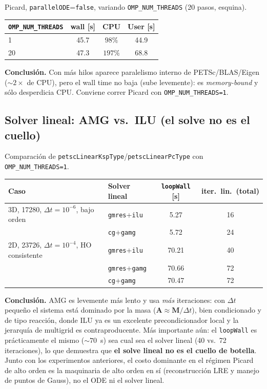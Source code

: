 \documentclass[11pt,a4paper]{article}
\newcommand{\code}[1]{\texttt{\small #1}}
\newcommand{\Mmass}{\mathbf{M}}
\newcommand{\Aimp}{\mathbf{A}}
\newcommand{\dictkey}[1]{\textcolor{black!60!green}{\texttt{\footnotesize #1}}}
\begin{document}
Picard, \dictkey{parallelODE}=\code{false}, variando \code{OMP\_NUM\_THREADS}
(20 pasos, esquina).

\begin{center}
\begin{tabular}{@{}lccc@{}}
\toprule
\code{OMP\_NUM\_THREADS} & wall [s] & CPU & User [s] \\
\midrule
1  & 45.7 & $98\%$  & 44.9 \\
20 & 47.3 & $197\%$ & 68.8 \\
\bottomrule
\end{tabular}
\end{center}

\noindent\textbf{Conclusión.} Con más hilos aparece paralelismo interno de
PETSc/BLAS/Eigen ($\sim 2\times$ de CPU), pero el wall time no baja (sube
levemente): es \emph{memory-bound} y sólo desperdicia CPU. Conviene correr Picard
con \code{OMP\_NUM\_THREADS=1}.

\subsection{Solver lineal: AMG vs.\ ILU (el solve no es el cuello)}
\label{sec:exp-gamg}

Comparación de \dictkey{petscLinearKspType}/\dictkey{petscLinearPcType} con
\code{OMP\_NUM\_THREADS=1}.

\begin{center}
\begin{tabular}{@{}llcc@{}}
\toprule
Caso & Solver lineal & \code{loopWall} [s] & iter.\ lin.\ (total) \\
\midrule
3D, \num{17280}, $\Delta t{=}10^{-6}$, bajo orden
   & \code{gmres}+\code{ilu}  & 5.27 & 16 \\
   & \code{cg}+\code{gamg}    & 5.72 & 24 \\
\midrule
2D, \num{23726}, $\Delta t{=}10^{-4}$, HO consistente
   & \code{gmres}+\code{ilu}  & 70.21 & 40 \\
   & \code{gmres}+\code{gamg} & 70.66 & 72 \\
   & \code{cg}+\code{gamg}    & 70.47 & 72 \\
\bottomrule
\end{tabular}
\end{center}

\noindent\textbf{Conclusión.} AMG es levemente más lento y usa \emph{más}
iteraciones: con $\Delta t$ pequeño el sistema está dominado por la masa
($\Aimp\approx\Mmass/\Delta t$), bien condicionado y de tipo reacción, donde ILU ya
es un excelente precondicionador local y la jerarquía de multigrid es
contraproducente. Más importante aún: el \code{loopWall} es prácticamente el mismo
($\sim 70$~s) sea cual sea el solver lineal (40 vs.\ 72 iteraciones), lo que
demuestra que \textbf{el solve lineal no es el cuello de botella}. Junto con los
experimentos anteriores, el costo dominante en el régimen Picard de alto orden es la
maquinaria de alto orden en sí (reconstrucción LRE y manejo de puntos de Gauss),
no el ODE ni el solver lineal.
\end{document}
